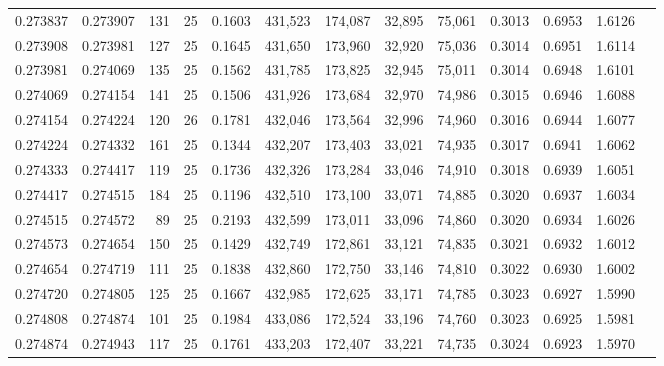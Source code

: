 \begin{tabular}{rrrrrrrrrrrrr}
0.273837 & 0.273907 &   131 &  25 &                                     0.1603 & 431,523 & 174,087 &  32,895 &  75,061 & 0.3013 & 0.6953 & 1.6126 \\
0.273908 & 0.273981 &   127 &  25 &                                     0.1645 & 431,650 & 173,960 &  32,920 &  75,036 & 0.3014 & 0.6951 & 1.6114 \\
0.273981 & 0.274069 &   135 &  25 &                                     0.1562 & 431,785 & 173,825 &  32,945 &  75,011 & 0.3014 & 0.6948 & 1.6101 \\
0.274069 & 0.274154 &   141 &  25 &                                     0.1506 & 431,926 & 173,684 &  32,970 &  74,986 & 0.3015 & 0.6946 & 1.6088 \\
0.274154 & 0.274224 &   120 &  26 &                                     0.1781 & 432,046 & 173,564 &  32,996 &  74,960 & 0.3016 & 0.6944 & 1.6077 \\
0.274224 & 0.274332 &   161 &  25 &                                     0.1344 & 432,207 & 173,403 &  33,021 &  74,935 & 0.3017 & 0.6941 & 1.6062 \\
0.274333 & 0.274417 &   119 &  25 &                                     0.1736 & 432,326 & 173,284 &  33,046 &  74,910 & 0.3018 & 0.6939 & 1.6051 \\
0.274417 & 0.274515 &   184 &  25 &                                     0.1196 & 432,510 & 173,100 &  33,071 &  74,885 & 0.3020 & 0.6937 & 1.6034 \\
0.274515 & 0.274572 &    89 &  25 &                                     0.2193 & 432,599 & 173,011 &  33,096 &  74,860 & 0.3020 & 0.6934 & 1.6026 \\
0.274573 & 0.274654 &   150 &  25 &                                     0.1429 & 432,749 & 172,861 &  33,121 &  74,835 & 0.3021 & 0.6932 & 1.6012 \\
0.274654 & 0.274719 &   111 &  25 &                                     0.1838 & 432,860 & 172,750 &  33,146 &  74,810 & 0.3022 & 0.6930 & 1.6002 \\
0.274720 & 0.274805 &   125 &  25 &                                     0.1667 & 432,985 & 172,625 &  33,171 &  74,785 & 0.3023 & 0.6927 & 1.5990 \\
0.274808 & 0.274874 &   101 &  25 &                                     0.1984 & 433,086 & 172,524 &  33,196 &  74,760 & 0.3023 & 0.6925 & 1.5981 \\
0.274874 & 0.274943 &   117 &  25 &                                     0.1761 & 433,203 & 172,407 &  33,221 &  74,735 & 0.3024 & 0.6923 & 1.5970 \\

\end{tabular}
